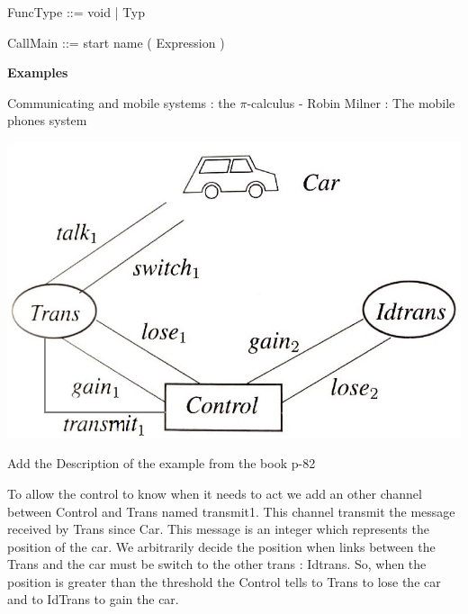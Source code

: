 \documentclass[11pt]{report}
\begin{document}
\begin{verbnobox}[\normalfont]
FuncType ::= void | Typ
\end{verbnobox}
\vspace*{3pt}

\begin{verbnobox}[\normalfont]
CallMain ::= start name ( Expression )
\end{verbnobox}
\vspace*{3pt}

\newpage
\centerline{\textbf{\Huge }}
\vspace*{3pt}
\vspace*{20pt}

\newpage
\centerline{\textbf{\Huge Examples}}
\vspace*{3pt}
\vspace*{20pt}
Communicating and mobile systems : the $\pi$-calculus - Robin Milner : The mobile phones system

\begin{center}
\includegraphics[scale = 0.5]{mobile-phone-system.jpg}
\end{center}
Add the Description of the example from the book p-82

To allow the control to know when it needs to act we add an other channel between Control and Trans named transmit1. This channel transmit the message received by Trans since Car. This message is an integer which represents the position of the car. We arbitrarily decide the position when links between the Trans and the car must be switch to the other trans : Idtrans. So, when the position is greater than the threshold the Control tells to Trans to lose the car and to IdTrans to gain the car.
\end{document}
